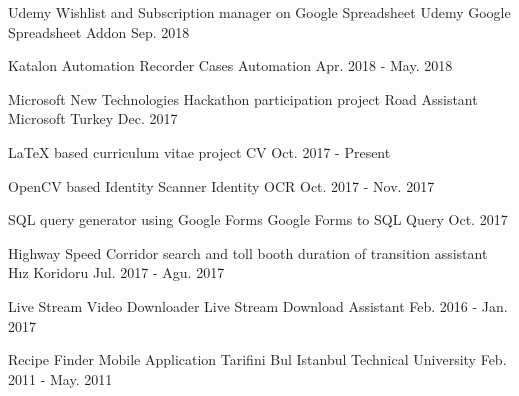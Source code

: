 \begin{cventries}
  \cventry
    {Udemy Wishlist and Subscription manager on Google Spreadsheet} %
    {Udemy Google Spreadsheet Addon} %
    {} %
    {Sep. 2018} %
    {}

  \cventry
    {Katalon Automation Recorder Cases} %
    {Automation} %
    {} %
    {Apr. 2018 - May. 2018} %
    {}

  \cventry
    {Microsoft New Technologies Hackathon participation project} %
    {Road Assistant} %
    {Microsoft Turkey} %
    {Dec. 2017} %
    {}

  \cventry
    {LaTeX based curriculum vitae project} %
    {CV} %
    {} %
    {Oct. 2017 - Present} %
    {}

  \cventry
    {OpenCV based Identity Scanner} %
    {Identity OCR} %
    {} %
    {Oct. 2017 - Nov. 2017} %
    {}

  \cventry
    {SQL query generator using Google Forms} %
    {Google Forms to SQL Query} %
    {} %
    {Oct. 2017} %
    {}

  \cventry
    {Highway Speed Corridor search and toll booth duration of transition assistant} %
    {Hız Koridoru} %
    {} %
    {Jul. 2017 - Agu. 2017} %
    {}

  \cventry
    {Live Stream Video Downloader} %
    {Live Stream Download Assistant} %
    {} %
    {Feb. 2016 - Jan. 2017} %
    {}

  \cventry
    {Recipe Finder Mobile Application} %
    {Tarifini Bul} %
    {Istanbul Technical University} %
    {Feb. 2011 - May. 2011} %
    {}

\end{cventries}

